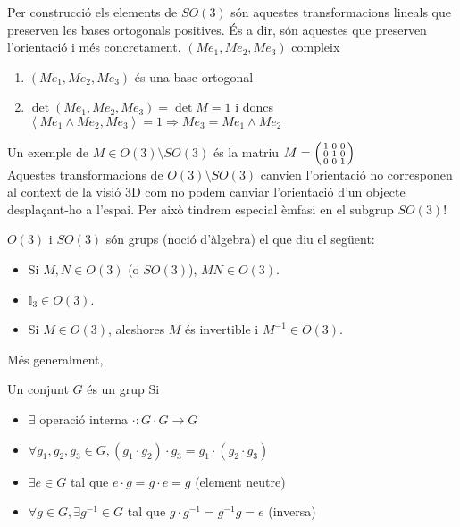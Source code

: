 \documentclass[../main.tex]{subfiles}
\begin{document}
Per construcció els elements de $SO(3)$ són aquestes transformacions lineals que preserven les
bases ortogonals positives. És a dir, són aquestes que preserven l'orientació i més concretament,
$\left(Me_1, Me_2, Me_3\right)$ compleix
\begin{enumerate}
    \item $\left(Me_1, Me_2, Me_3\right)$ és una base ortogonal
    \item $\det{\left(Me_1, Me_2, Me_3\right)} = \det{M} = 1$ i doncs $\left\langle Me_1\wedge Me_2, Me_3\right\rangle = 1 \Rightarrow Me_3 = Me_1\wedge Me_2$
\end{enumerate}
Un exemple de $M \in O(3)\setminus SO(3)$ és la matriu $M = \begin{psmallmatrix}
    1 & 0 & 0\\
    0 & 1 & 0\\
    0 & 0 & 1
\end{psmallmatrix}$\\
Aquestes transformacions de $O(3)\setminus SO(3)$ canvien l'orientació no corresponen al context de
la visió 3D com no podem canviar l'orientació d'un objecte desplaçant-ho a l'espai. Per això tindrem
especial èmfasi en el subgrup $SO(3)$!
\begin{obs}
    $O(3)$ i $SO(3)$ són grups (noció d'àlgebra) el que diu el següent:
    \begin{itemize}
        \item Si $M, N \in O(3)$ (o $SO(3)$), $MN \in O(3)$.
        \item $\mathbb{I}_3 \in O(3)$.
        \item Si $M \in O(3)$, aleshores $M$ és invertible i $M^{-1} \in O(3)$.
    \end{itemize}
\end{obs}
Més generalment,
\begin{definicio}
    Un conjunt $G$ és un grup Si
    \begin{itemize}
        \item $\exists$ operació interna $\cdot : G\cdot G \to G$
        \item $\forall g_1, g_2, g_3 \in G, (g_1\cdot g_2) \cdot g_3 = g_1\cdot (g_2 \cdot g_3)$
        \item $\exists e \in G$ tal que $e\cdot g = g \cdot e = g$ (element neutre)
        \item $\forall g \in G, \exists g^{-1} \in G$ tal que $ g\cdot g^{-1} = g^{-1}g = e$ (inversa)
    \end{itemize}
\end{definicio}
\end{document}
